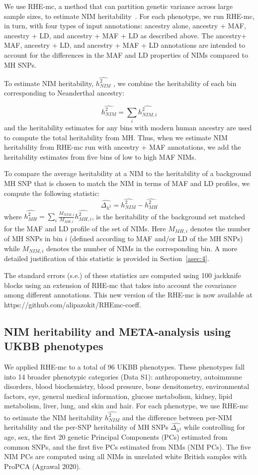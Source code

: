 We use RHE-mc, a method that can partition genetic variance across large sample sizes, to estimate NIM heritability~\cite{pazokitoroudi2020efficient}. For each phenotype, we run RHE-mc, in turn, with four types of input annotations: ancestry alone, ancestry + MAF, ancestry + LD, and ancestry + MAF + LD as described above. The ancestry+ MAF, ancestry + LD, and ancestry + MAF + LD annotations are intended to account for the differences in the MAF and LD properties of NIMs compared to MH SNPs.

To estimate NIM heritability, $\hat{h^2_{NIM}}$ , we combine the heritability of each bin corresponding to Neanderthal ancestry:

$$\hat{h^2_{NIM}} = \sum_i \hat{h^2_{NIM,i}}$$
and the heritability estimates for any bins with modern human ancestry are used to compute the total heritability from MH. Thus, when we estimate NIM heritability from RHE-mc run with ancestry + MAF annotations, we add the heritability estimates from five bins of low to high MAF NIMs.
 
To compare the average heritability at a NIM to the heritability of a background MH SNP that is chosen to match the NIM in terms of MAF and LD profiles, we compute the following statistic:
$$\hat{\Delta_{h^2}}=\hat{h^2_{NIM}}-\hat{h^2_{MH}}$$
where $\hat{h^2_{MH}} = \sum_i \frac{M_{NIM,i}}{M_{MH,i}} \hat{h^2_{MH,i}}$, is the heritability of the background set matched for the MAF and LD profile of the set of NIMs. Here $M_{MH,i}$ denotes the number of MH SNPs in bin $i$  (defined according to MAF and/or LD of the MH SNPs) while $M_{NIM,i}$ denotes the number of NIMs in the corresponding bin. A more detailed justification of this statistic is provided in Section~\ref{asec:4}.

The standard errors (s.e.) of these statistics are computed using 100 jackknife blocks using an extension of RHE-mc that takes into account the covariance among different annotations. This new version of the RHE-mc is now available at https://github.com/alipazokit/RHEmc-coeff. 

\subsection{NIM heritability and META-analysis using UKBB phenotypes}
\label{sec:meta}
We applied RHE-mc to a total of 96 UKBB phenotypes. These phenotypes fall into 14 broader phenotypic categories (Data S1): anthropometry, autoimmune disorders, blood biochemistry, blood pressure, bone densitometry, environmental factors, eye, general medical information, glucose metabolism, kidney, lipid metabolism, liver, lung, and skin and hair. For each phenotype, we use RHE-mc to estimate the NIM heritability $\hat{h^2_{NIM}}$ and the difference between per-NIM heritability and the per-SNP heritability of MH SNPs $\hat{\Delta_{h^2}}$ while controlling for age, sex, the first 20 genetic Principal Components (PCs) estimated from common SNPs, and the first five PCs estimated from NIMs (NIM PCs). The five NIM PCs are computed using all NIMs in unrelated white British samples with ProPCA (Agrawal 2020). 

